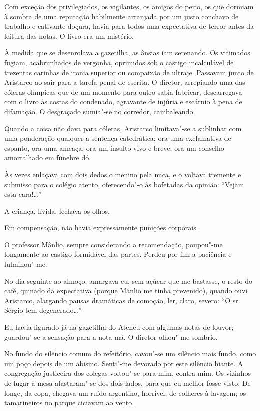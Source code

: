 Com exceção dos privilegiados, os vigilantes,
os amigos do peito, os que dormiam à sombra de uma reputação habilmente
arranjada por um justo conchavo de trabalho e cativante doçura, havia
para todos uma expectativa de terror antes da leitura das notas. O
livro era um mistério. 


À medida que se desenrolava a gazetilha, as
ânsias iam serenando. Os vitimados fugiam, acabrunhados de vergonha,
oprimidos sob o castigo incalculável de trezentas carinhas de ironia
superior ou compaixão de ultraje. Passavam junto de Aristarco ao sair
para a tarefa penal de escrita. O diretor, arrepiando uma das cóleras
olímpicas que de um momento para outro sabia fabricar, descarregava com
o livro às costas do condenado, agravante de injúria e escárnio à pena
de difamação. O desgraçado sumia"-se no corredor, cambaleando. 

Quando a coisa não dava para cóleras, Aristarco limitava"-se a sublinhar com
uma ponderação qualquer a sentença catedrática; ora uma exclamativa de
espanto, ora uma ameaça, ora um insulto vivo e breve, ora um conselho
amortalhado em fúnebre dó. 

Às vezes enlaçava com dois dedos o menino
pela nuca, e o voltava tremente e submisso para o colégio atento,
oferecendo"-o às bofetadas da opinião: ``Vejam esta cara!\ldots{}'' 

A criança, lívida, fechava os olhos. 

Em compensação, não havia expressamente punições corporais. 

O professor Mânlio, sempre
considerando a recomendação, poupou"-me longamente ao castigo
formidável das partes. Perdeu por fim a paciência e fulminou"-me. 

No dia seguinte ao almoço, amargava eu, sem açúcar que me bastasse, o
resto do café, quinado da expectativa (porque Mânlio me tinha
prevenido), quando ouvi Aristarco, alargando pausas dramáticas de
comoção, ler, claro, severo: ``O sr.\,Sérgio tem degenerado\ldots{}'' 

Eu havia figurado já na gazetilha do Ateneu com algumas notas de louvor;
guardou"-se a sensação para a nota má. O diretor olhou"-me sombrio.

No fundo do silêncio comum do refeitório, cavou"-se um silêncio mais
fundo, como um poço depois de um abismo. Senti"-me devorado por este
silêncio hiante. A congregação justiceira dos colegas voltou"-se para
mim, contra mim. Os vizinhos de lugar à mesa afastaram"-se dos dois
lados, para que eu melhor fosse visto. De longe, da copa, chegava um
ruído argentino, horrível, de colheres à lavagem; os tamarineiros no
parque ciciavam ao vento. 

